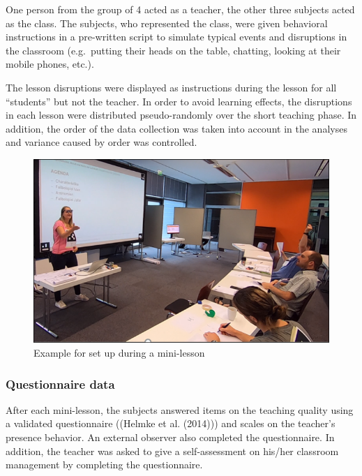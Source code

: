 \documentclass[
  english,
  man,floatsintext]{apa6}
\begin{document}
One person from the group of 4 acted as a teacher, the other three subjects acted as the class. The subjects, who represented the class, were given behavioral instructions in a pre-written script to simulate typical events and disruptions in the classroom (e.g.~putting their heads on the table, chatting, looking at their mobile phones, etc.).

The lesson disruptions were displayed as instructions during the lesson for all ``students'' but not the teacher. In order to avoid learning effects, the disruptions in each lesson were distributed pseudo-randomly over the short teaching phase. In addition, the order of the data collection was taken into account in the analyses and variance caused by order was controlled.



\begin{figure}

{\centering \includegraphics{./pictures/datacollection} 

}

\caption{Example for set up during a mini-lesson}\label{fig:datacollection}
\end{figure}

\hypertarget{questionnaire-data}{%
\subsubsection{Questionnaire data}\label{questionnaire-data}}

After each mini-lesson, the subjects answered items on the teaching quality using a validated questionnaire ((Helmke et al. (2014))) and scales on the teacher's presence behavior. An external observer also completed the questionnaire. In addition, the teacher was asked to give a self-assessment on his/her classroom management by completing the questionnaire.
\end{document}
